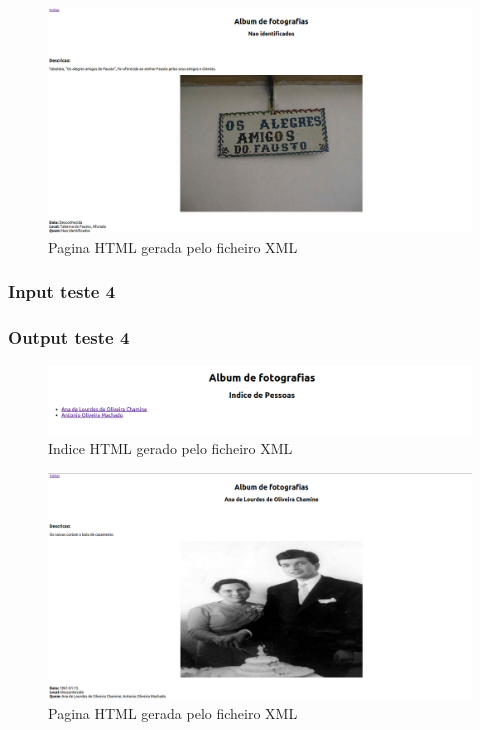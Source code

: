 \begin{figure}[H]
\centering
\includegraphics[width=15cm]{anexos/2-1/Exemplo3/Screenshots/pag1.png}
\caption{Pagina HTML gerada pelo ficheiro XML}
\end{figure}

\subsubsection{Input teste 4}
\label{seq:anex-museu-test-in04}


\subsubsection{Output teste 4}
\label{seq:anex-museu-test-out04-01}


\begin{figure}[H]
\centering
\includegraphics[width=15cm]{anexos/2-1/Exemplo4/Screenshots/indice.png}
\caption{Indice HTML gerado pelo ficheiro XML}
\end{figure}

\label{seq:anex-museu-test-out04-02}


\begin{figure}[H]
\centering
\includegraphics[width=15cm]{anexos/2-1/Exemplo4/Screenshots/pag1.png}
\caption{Pagina HTML gerada pelo ficheiro XML}
\end{figure}

